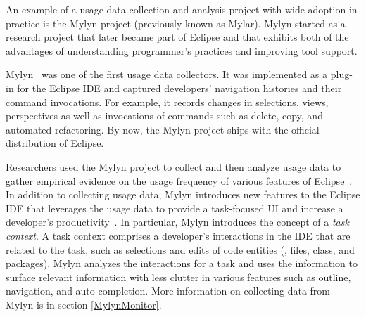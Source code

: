 An example of a usage data collection and analysis project with wide adoption
in practice is the Mylyn project (previously known as Mylar). Mylyn started as a research project that later became part of Eclipse and that exhibits both of the advantages of understanding programmer's practices and improving tool support.

Mylyn~\cite{V:Murphy2006How} was one of the first usage data collectors. It was
implemented as a plug-in for the Eclipse IDE and captured developers' navigation
histories and their command invocations. For example, it records changes in
selections, views, perspectives as well as invocations of commands such as
delete, copy, and automated refactoring. By now, the Mylyn project ships with the official distribution of Eclipse.

Researchers used the Mylyn project to collect and then analyze usage data to gather empirical evidence on the usage frequency of various features of Eclipse~\cite{V:Murphy2006How}. In addition to collecting usage data, Mylyn introduces new features to the Eclipse
IDE that leverages the usage data to provide a task-focused UI and increase a developer's productivity~\cite{Kersten-Mylin}. In particular, Mylyn introduces the concept of a \emph{task context}. A task context comprises a developer's interactions in the IDE that are related to the task, such as selections and edits of code entities (\eg, files, class, and packages). Mylyn analyzes the interactions for a task and uses the information to surface relevant information with less clutter in various features such as outline, navigation, and auto-completion.  More information on collecting data from Mylyn is in section \ref{MylynMonitor}.

%



